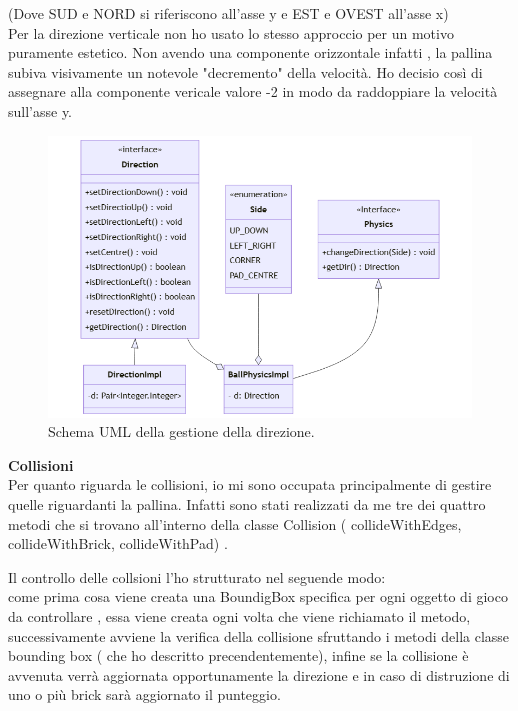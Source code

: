 \documentclass[a4paper,12pt]{report}
\begin{document}
(Dove SUD e NORD si riferiscono all'asse y e EST e OVEST all'asse x)
\\Per la direzione verticale non ho usato lo stesso approccio per un motivo puramente estetico. Non avendo una componente orizzontale infatti , la pallina subiva visivamente un notevole "decremento" della velocità. Ho decisio così di assegnare alla componente vericale valore -2 in modo da raddoppiare la velocità sull'asse y.
\begin{figure}[H]
    \centering{}
    \includegraphics[scale=0.6]{images/Physics.png}
    \caption{Schema UML della gestione della direzione.}
    \label{images:Physics}
\end{figure}
\textbf{Collisioni}\\
Per quanto riguarda le collisioni, io mi sono occupata principalmente di gestire quelle riguardanti la pallina.
Infatti sono stati realizzati da me tre dei quattro metodi che si trovano all'interno della classe Collision ( collideWithEdges, collideWithBrick, collideWithPad) .

Il controllo delle collsioni l'ho strutturato nel seguende modo:
\\ come prima cosa viene creata una BoundigBox specifica per ogni oggetto di gioco da controllare , essa viene creata ogni volta che viene richiamato il metodo, successivamente avviene la verifica della collisione sfruttando i metodi della classe bounding box ( che ho descritto precendentemente), infine se la collisione è avvenuta verrà aggiornata opportunamente la direzione e in caso di distruzione di uno o più brick sarà aggiornato il punteggio.
\end{document}
